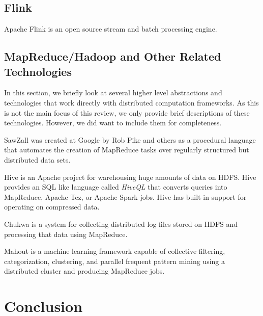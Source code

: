 \documentclass[]{article}
\begin{document}
\subsection{Flink}
Apache Flink\cite{carbone2015apache} is an open source stream and batch processing engine.


\subsection{MapReduce/Hadoop and Other Related Technologies}
In this section, we briefly look at several higher level abstractions and technologies that work directly with distributed computation frameworks. As this is not the main focus of this review, we only provide brief descriptions of these technologies. However, we did want to include them for completeness.

SawZall\cite{pike2005interpreting} was created at Google by Rob Pike and others as a procedural language that automates the creation of MapReduce tasks over regularly structured but distributed data sets. 



Hive\cite{thusoo2009hive} is an Apache project for warehousing huge amounts of data on HDFS. Hive provides an SQL like language called \textit{HiveQL} that converts queries into MapReduce, Apache Tez, or Apache Spark jobs. Hive has built-in support for operating on compressed data.

Chukwa\cite{rabkin2010chukwa} is a system for collecting distributed log files stored on HDFS and processing that data using MapReduce.

Mahout\cite{owen2012mahout} is a machine learning framework capable of collective filtering, categorization, clustering, and parallel frequent pattern mining using a distributed cluster and producing MapReduce jobs.



\section{Conclusion}



\end{document}

